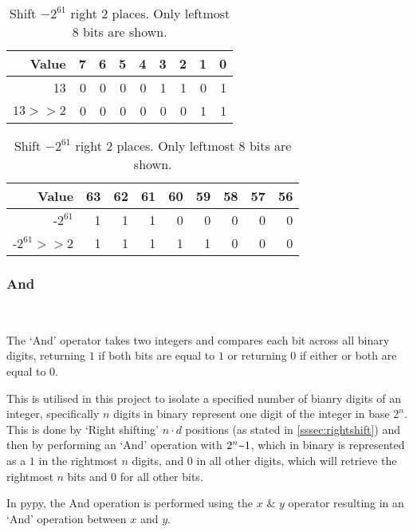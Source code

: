 \documentclass[12pt]{article}
\newcommand{\minus}{\scalebox{0.75}[1.0]{$-$}}
\begin{document}
\begin{table}[!htb]
	
\setlength{\tabcolsep}{4.5pt}
\begin{minipage}{.45\textwidth}
	\centering

		\begin{tabular}[t]{r|rrrrrrrr}
			\hline
			 Value   &   7 &   6 &   5 &   4 &   3 &   2 &   1 &   0 \\
			 \hline
			 13      &   0 &   0 &   0 &   0 &   1 &   1 &   0 &   1 \\
			 $13 \ensuremath{>}\ensuremath{>} 2$ &   0 &   0 &   0 &   0 &   0 &   0 &   1 &   1 \\
			 \hline
		\end{tabular}

	\caption{Shift 13 right 2 bits. Only rightmost 8 bits are shown}
	
\end{minipage}\hfill%
	\begin{minipage}{.55\textwidth}
		\centering

		\begin{tabular}[t]{r|rrrrrrrr}
			\hline
			 Value   &   63 &  62 &   61 &   60 &   59 &   58 &   57 &   56 \\
			\hline
			 -$2^{61}$      &   1 &    1 &    1 &    0 &    0 &    0 &    0 &    0 \\
			 -$2^{61} \ensuremath{>}\ensuremath{>} 2$ &    1 &    1 &    1 &    1 &    1 &    0 &    0 &    0 \\
			\hline
		\end{tabular}



		\caption{Shift $-2^{61}$ right 2 places. Only leftmost 8 bits are shown.}
		\label{table2}
	\end{minipage}\hfill%

\end{table}
\pagebreak
\subsubsection{And}\
\label{sssec:and}
\par
The `And' operator takes two integers and compares each bit across all binary digits, returning $1$ if both bits are equal to $1$ or returning $0$ if either or both are equal to $0$.
\par
 This is utilised in this project to isolate a specified number of bianry digits of an integer, specifically $n$ digits in binary represent one digit of the integer in base $2^{n}$. This is done by `Right shifting' $n \cdot d$ positions (as stated in \ref{sssec:rightshift}) and then by performing an `And' operation with $2^{n}\minus1$, which in binary is represented as a $1$ in the rightmost $n$ digits, and 0 in all other digits, which will retrieve the rightmost $n$ bits and 0 for all other bits.
\par
In pypy, the And operation is performed using the  $x$ $\&$ $y$ operator resulting in an `And' operation between $x$ and $y$.
\par
\end{document}
